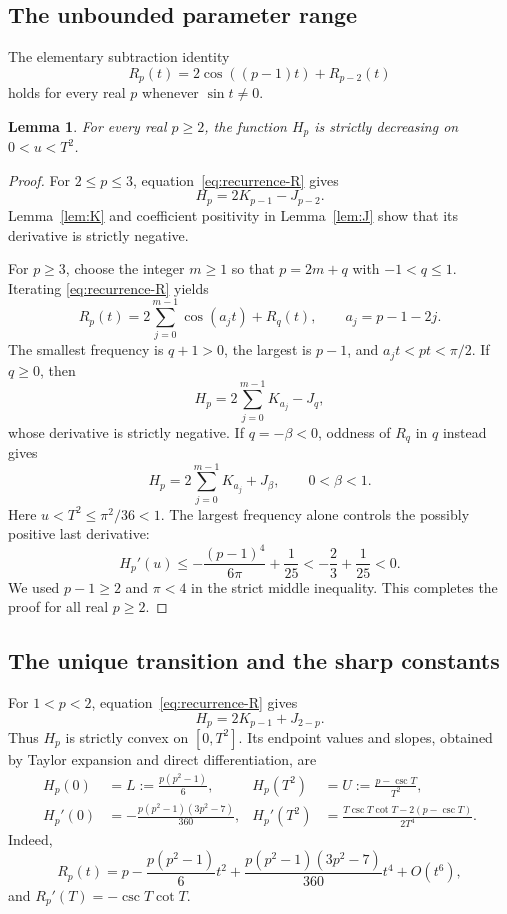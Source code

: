 \documentclass[11pt,a4paper]{article}
\numberwithin{equation}{section}
\newtheorem{lemma}[theorem]{Lemma}
\theoremstyle{remark}
\begin{document}
\subsection{The unbounded parameter range}

The elementary subtraction identity
\begin{equation}\label{eq:recurrence-R}
 R_p(t)=2\cos((p-1)t)+R_{p-2}(t)
\end{equation}
holds for every real $p$ whenever $\sin t\ne0$.

\begin{lemma}\label{lem:large-p}
For every real $p\ge2$, the function $H_p$ is strictly decreasing
on $0<u<T^2$.
\end{lemma}

\begin{proof}
For $2\le p\le3$, equation~\eqref{eq:recurrence-R} gives
\[
 H_p=2K_{p-1}-J_{p-2}.
\]
Lemma~\ref{lem:K} and coefficient positivity in Lemma~\ref{lem:J}
show that its derivative is strictly negative.

For $p\ge3$, choose the integer $m\ge1$ so that
$p=2m+q$ with $-1<q\le1$. Iterating
\eqref{eq:recurrence-R} yields
\[
 R_p(t)=2\sum_{j=0}^{m-1}\cos(a_jt)+R_q(t),
 \qquad a_j=p-1-2j.
\]
The smallest frequency is $q+1>0$, the largest is $p-1$, and
$a_jt<pt<\pi/2$. If $q\ge0$, then
\[
 H_p=2\sum_{j=0}^{m-1}K_{a_j}-J_q,
\]
whose derivative is strictly negative. If $q=-\beta<0$, oddness
of $R_q$ in $q$ instead gives
\[
 H_p=2\sum_{j=0}^{m-1}K_{a_j}+J_\beta,
 \qquad 0<\beta<1.
\]
Here $u<T^2\le\pi^2/36<1$. The largest frequency alone controls
the possibly positive last derivative:
\[
 H_p'(u)\le-\frac{(p-1)^4}{6\pi}+\frac1{25}
 <-\frac23+\frac1{25}<0.
\]
We used $p-1\ge2$ and $\pi<4$ in the strict middle inequality.
This completes the proof for all real $p\ge2$.
\end{proof}

\subsection{The unique transition and the sharp constants}

For $1<p<2$, equation~\eqref{eq:recurrence-R} gives
\begin{equation}\label{eq:small-p-convex}
 H_p=2K_{p-1}+J_{2-p}.
\end{equation}
Thus $H_p$ is strictly convex on $[0,T^2]$. Its endpoint values
and slopes, obtained by Taylor expansion and direct differentiation,
are
\begin{align}
 H_p(0)&=L:=\frac{p(p^2-1)}6,
 &H_p(T^2)&=U:=\frac{p-\csc T}{T^2},\label{eq:H-endpoints}\\
 H_p'(0)&=-\frac{p(p^2-1)(3p^2-7)}{360},
 &H_p'(T^2)&=\frac{T\csc T\cot T-2(p-\csc T)}{2T^4}.
 \label{eq:H-slopes}
\end{align}
Indeed,
\[
 R_p(t)=p-\frac{p(p^2-1)}6t^2
 +\frac{p(p^2-1)(3p^2-7)}{360}t^4+O(t^6),
\]
and $R_p'(T)=-\csc T\cot T$.
\end{document}

